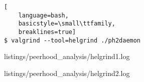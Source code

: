 \ApplyOnePageAppendixPageStyle{}

\begin{lstlisting}[
	language=bash,
	basicstyle=\small\ttfamily,
	breaklines=true]
$ valgrind --tool=helgrind ./ph2daemon
\end{lstlisting}

\ApplyAppendixFirstPageStyle{}


	{listings/peerhood_analysis/helgrind1.log}

\newpage
\ApplyAppendixLastPageStyle{}


	{listings/peerhood_analysis/helgrind2.log}